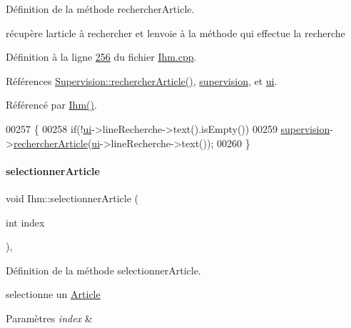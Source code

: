 Définition de la méthode rechercher\+Article. 

récupère l\textquotesingle{}article à rechercher et l\textquotesingle{}envoie à la méthode qui effectue la recherche 

Définition à la ligne \hyperlink{_ihm_8cpp_source_l00256}{256} du fichier \hyperlink{_ihm_8cpp_source}{Ihm.\+cpp}.



Références \hyperlink{_supervision_8cpp_source_l00305}{Supervision\+::rechercher\+Article()}, \hyperlink{_ihm_8h_source_l00100}{supervision}, et \hyperlink{_ihm_8h_source_l00099}{ui}.



Référencé par \hyperlink{_ihm_8cpp_source_l00029}{Ihm()}.


\begin{DoxyCode}
00257 \{
00258     \textcolor{keywordflow}{if}(!\hyperlink{class_ihm_a0ac5f47856566ceeeca1720109bf70ea}{ui}->lineRecherche->text().isEmpty())
00259         \hyperlink{class_ihm_a454ab89ced1b27fcb42d550e443e780c}{supervision}->\hyperlink{class_supervision_af2df200be6727338110b81812703d0ae}{rechercherArticle}(\hyperlink{class_ihm_a0ac5f47856566ceeeca1720109bf70ea}{ui}->lineRecherche->text());
00260 \}
\end{DoxyCode}
\mbox{\label{class_ihm_ad9b83836021fc8542db033da186cc64c}} 
\paragraph{\texorpdfstring{selectionner\+Article}{selectionnerArticle}}
{\footnotesize\ttfamily void Ihm\+::selectionner\+Article (\begin{DoxyParamCaption}\item[{int}]{index }\end{DoxyParamCaption})\hspace{0.3cm}{\ttfamily [private]}, {\ttfamily [slot]}}



Définition de la méthode selectionner\+Article. 

selectionne un \hyperlink{class_article}{Article} 
\begin{DoxyParams}{Paramètres}
{\em index} & \\
\hline
\end{DoxyParams}


